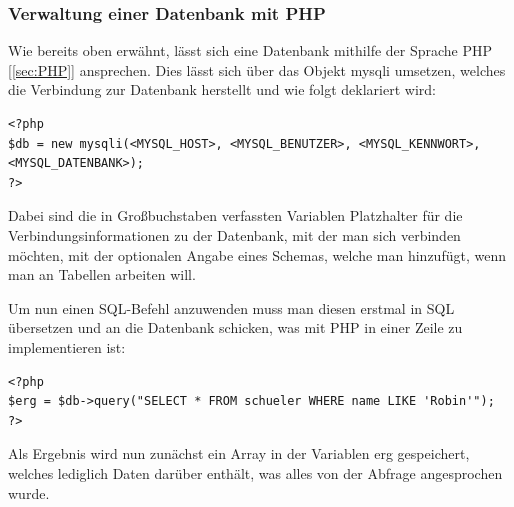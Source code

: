 \documentclass[12pt,a4paper,bibliography=totocnumbered,listof=totocnumbered]{scrartcl}
\begin{document}
\subsubsection{Verwaltung einer Datenbank mit PHP}
\label{sec:SQL-PHP}
Wie bereits oben erwähnt, lässt sich eine Datenbank mithilfe der Sprache PHP [\ref{sec:PHP}] ansprechen.
Dies lässt sich über das Objekt \glqq mysqli\grqq{} umsetzen, welches die Verbindung zur Datenbank herstellt und wie folgt deklariert wird:

\vspace{1em}
\begin{lstlisting}[caption= SQL PHP Mysqli, label=lst:sql-php-mysqli]
<?php
$db = new mysqli(<MYSQL_HOST>, <MYSQL_BENUTZER>, <MYSQL_KENNWORT>, <MYSQL_DATENBANK>);
?>
\end{lstlisting}

Dabei sind die in Großbuchstaben verfassten Variablen Platzhalter für die Verbindungsinformationen zu der Datenbank, mit der man sich verbinden möchten, mit der optionalen Angabe eines Schemas, welche man hinzufügt, wenn man an Tabellen arbeiten will.

Um nun einen SQL-Befehl anzuwenden muss man diesen erstmal in SQL übersetzen und an die Datenbank schicken, was mit PHP in einer Zeile zu implementieren ist:

\vspace{1em}
\begin{lstlisting}[caption= SQL PHP Mysqli, label=lst:sql-php-mysqli]
<?php
$erg = $db->query("SELECT * FROM schueler WHERE name LIKE 'Robin'");
?>
\end{lstlisting}

Als Ergebnis wird nun zunächst ein Array in der Variablen \glqq erg\grqq{} gespeichert, welches lediglich Daten darüber enthält, was alles von der Abfrage angesprochen wurde.
\end{document}
